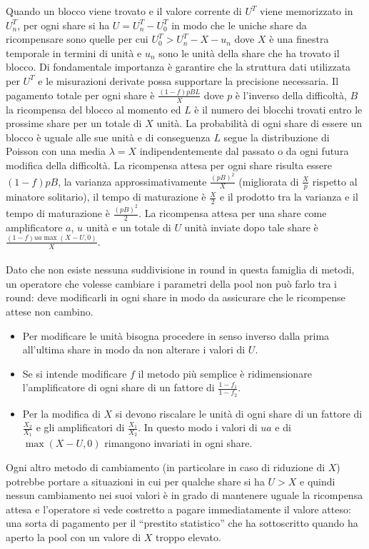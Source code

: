 Quando un blocco viene trovato e il valore corrente di $U^T$ viene memorizzato in $U^T_n$, per ogni share si ha $U=U^T_n - U^T_0$ in modo che le uniche share da ricompensare sono quelle per cui $U^T_0 > U^T_n - X -u_n$ dove $X$ è una finestra temporale in termini di unità e $u_n$ sono le unità della share che ha trovato il blocco. Di fondamentale importanza è garantire che la struttura dati utilizzata per $U^T$ e le misurazioni derivate possa supportare la precisione necessaria.
Il pagamento totale per ogni share è $\frac{(1-f)pBL}{X}$ dove $p$ è l'inverso della difficoltà, $B$ la ricompensa del blocco al momento ed $L$ è il numero dei blocchi trovati entro le prossime share per un totale di $X$ unità. La probabilità di ogni share di essere un blocco è uguale alle sue unità e di conseguenza $L$ segue la distribuzione di Poisson con una media $\lambda = X$ indipendentemente dal passato o da ogni futura modifica della difficoltà. La ricompensa attesa per ogni share risulta essere $(1-f)pB$, la varianza approssimativamente $\frac{(pB)^2}{X}$ (migliorata di $\frac{X}{p}$ rispetto al minatore solitario), il tempo di maturazione è $\frac{X}{2}$ e il prodotto tra la varianza e il tempo di maturazione è $\frac{(pB)^2}{2}$.
La ricompensa attesa per una share come amplificatore $a$, $u$ unità e un totale di $U$ unità inviate dopo tale share è $\frac{(1-f)ua\max(X-U,0)}{X}$.\\\\
Dato che non esiste nessuna suddivisione in round in questa famiglia di metodi, un operatore che volesse cambiare i parametri della pool non può farlo tra i round: deve modificarli in ogni share in modo da assicurare che le ricompense attese non cambino.
\begin{itemize}
  \item Per modificare le unità bisogna procedere in senso inverso dalla prima all'ultima share in modo da non alterare i valori di $U$.
  \item Se si intende modificare $f$ il metodo più semplice è ridimensionare l'amplificatore di ogni share di un fattore di $\frac{1-f_1}{1-f_2}$.
  \item Per la modifica di $X$ si devono riscalare le unità di ogni share di un fattore di $\frac{X_2}{X_1}$ e gli amplificatori di $\frac{X_1}{X_2}$. In questo modo i valori di $ua$ e di $\max(X-U, 0)$ rimangono invariati in ogni share.
\end{itemize}
Ogni altro metodo di cambiamento (in particolare in caso di riduzione di $X$) potrebbe portare a situazioni in cui per qualche share si ha $U > X$ e quindi nessun cambiamento nei suoi valori è in grado di mantenere uguale la ricompensa attesa e l'operatore si vede costretto a pagare immediatamente il valore atteso: una sorta di pagamento per il ``prestito statistico'' che ha sottoscritto quando ha aperto la pool con un valore di $X$ troppo elevato.


